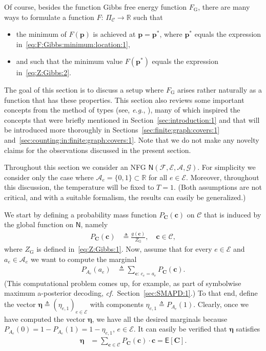 \documentclass[journal, twocolumn]{IEEEtran}
\renewcommand{\mathbf}[1]{{\bm{#1}}}
\newcommand{\confer}{\emph{cf.}}
\newcommand{\eg}{\emph{e.g.}}
\newcommand{\R}{\mathbb{R}}
\newcommand{\Expec}{\mathsf{E}}
\newcommand{\vect}[1]{\mathbf{#1}}
\newcommand{\code}[1]{\mathcal{#1}}
\newcommand{\set}[1]{\mathcal{#1}}
\newcommand{\graph}[1]{\mathsf{#1}}
\newcommand{\defeq}{\triangleq}
\newcommand{\codeC}{\code{C}}
\newcommand{\codeCedge}{\code{C}}
\newcommand{\setA}{\set{A}}
\newcommand{\setE}{\set{E}}
\newcommand{\setF}{\set{F}}
\newcommand{\setG}{\set{G}}
\newcommand{\veta}{\boldsymbol{\eta}}
\newcommand{\vC}{\vect{C}}
\newcommand{\vc}{\vect{c}}
\newcommand{\vp}{\vect{p}}
\newcommand{\graphN}{\graph{N}}
\newcommand{\?}{\mathrm{?}}
\newcommand{\FGibbs}{F_{\mathrm{G}}}
\newcommand{\ZGibbs}{Z_{\mathrm{G}}}
\newcommand{\setPi}{\Pi}
\begin{document}
Of course, besides the function Gibbs free energy function $\FGibbs$, there
are many ways to formulate a function $F: \, \setPi_{\codeC} \to \R$ such that
\begin{itemize}

\item the minimum of $F(\vp)$ is achieved at $\vp = \vp^{*}$, where $\vp^{*}$
  equals the expression in~\eqref{eq:F:Gibbs:minimum:location:1},

\item and such that the minimum value $F(\vp^{*})$ equals the expression
  in~\eqref{eq:Z:Gibbs:2}.

\end{itemize}
The goal of this section is to discuss a setup where $\FGibbs$ arises rather
naturally as a function that has these properties. This section also reviews
some important concepts from the method of types (see, \eg,
\cite{Csiszar:Korner:81, Cover:Thomas:91}), many of which inspired the
concepts that were briefly mentioned in Section~\ref{sec:introduction:1} and
that will be introduced more thoroughly in
Sections~\ref{sec:finite:graph:covers:1}
and~\ref{sec:counting:in:finite:graph:covers:1}. Note that we do not make any
novelty claims for the observations discussed in the present section.


Throughout this section we consider an NFG $\graphN(\setF,\setE, \setA,
\setG)$. For simplicity we consider only the case where $\setA_e = \{ 0, 1 \}
\subset \R$ for all $e \in \setE$. Moreover, throughout this discussion, the
temperature will be fixed to $T = 1$. (Both assumptions are not critical, and
with a suitable formalism, the results can easily be generalized.)

We start by defining a probability mass function $P_{\vC}(\vc)$ on
$\codeCedge$ that is induced by the global function on $\graphN$, namely
\begin{align*}
  P_{\vC}(\vc)
    &\defeq
       \frac{g(\vc)}
            {\ZGibbs},
            \quad \vc \in \codeCedge,
\end{align*}
where $\ZGibbs$ is defined in~\eqref{eq:Z:Gibbs:1}. 
Now, assume that for every $e \in \setE$ and $a_e \in \setA_e$ we want to
compute the marginal
\begin{align*}
  P_{A_e}(a_e)
    &\defeq
       \sum_{\vc: \, c_e = a_e}
         P_{\vC}(\vc).
\end{align*}
(This computational problem comes up, for example, as part of symbolwise
maximum a-posterior decoding, \confer~Section~\ref{sec:SMAPD:1}.) To that end,
define the vector $\veta \defeq (\eta_{e,1})_{e \in \setE}$ with components
$\eta_{e,1} \defeq P_{A_e}(1)$. Clearly, once we have computed the vector
$\veta$, we have all the desired marginals because $P_{A_e}(0) = 1 -
P_{A_e}(1) = 1 - \eta_{e,1}$, $e \in \setE$. It can easily be verified that
$\veta$ satisfies
\begin{align}
  \veta
    &= \sum_{\vc \in \codeCedge}
         P_{\vC}(\vc)
         \cdot
         \vc
     = \Expec[\vC].
         \label{eq:veta:expression:1}
\end{align}
\end{document}
